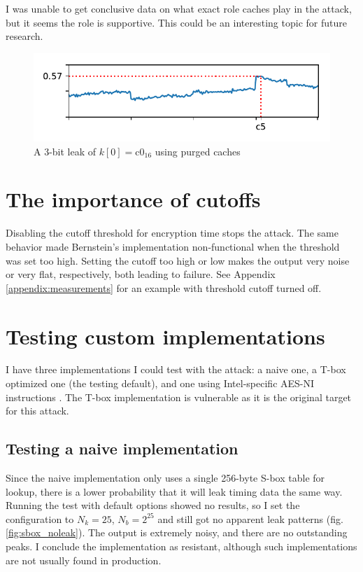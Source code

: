 \documentclass[thesis=B,english]{FITthesis}[2019/03/06]
\begin{document}
I was unable to get conclusive data on what exact role caches play in the attack, but it seems the role is supportive.
This could be an interesting topic for future research.

\begin{figure}
	\centering
	\includegraphics{caches_on_key_3e.pdf}
	\caption{A 3-bit leak of $k[0] = \text{c0}_{16}$ using purged caches}
	\label{fig:cache_off_k4}
\end{figure}

\section{The importance of cutoffs}
Disabling the cutoff threshold for encryption time stops the attack. The same behavior made Bernstein's implementation non-functional when the threshold was set too high.
Setting the cutoff too high or low makes the output very noise or very flat, respectively, both leading to failure.
See Appendix \ref{appendix:measurements} for an example with threshold cutoff turned off.

\section{Testing custom implementations}
I have three implementations I could test with the attack: a naive one, a T-box optimized one (the testing default), and one using Intel-specific AES-NI instructions \cite{IntelAESNI}.
The T-box implementation is vulnerable as it is the original target for this attack.

\subsection{Testing a naive implementation}
Since the naive implementation only uses a single 256-byte S-box table for lookup, there is a lower probability that it will leak timing data the same way.
Running the test with default options showed no results, so I set the configuration to $N_k = 25$, $N_b = 2^{25}$ and still got no apparent leak patterns (fig. \ref{fig:sbox_noleak}).
The output is extremely noisy, and there are no outstanding peaks.
I conclude the implementation as resistant, although such implementations are not usually found in production.
\end{document}
